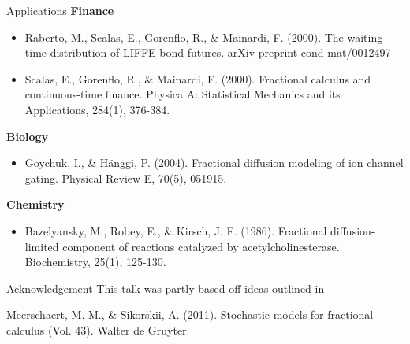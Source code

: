 \documentclass[pdf]{beamer}
\begin{document}
\begin{frame}{Applications}
    \textbf{Finance}
    \begin{itemize}
        \item Raberto, M., Scalas, E., Gorenflo, R., \& Mainardi, F. (2000). The waiting-time distribution of LIFFE bond futures. arXiv preprint cond-mat/0012497
        \item Scalas, E., Gorenflo, R., \& Mainardi, F. (2000). Fractional calculus and continuous-time finance. Physica A: Statistical Mechanics and its Applications, 284(1), 376-384.
    \end{itemize}
    \textbf{Biology}
    \begin{itemize}
        \item Goychuk, I., \& Hänggi, P. (2004). Fractional diffusion modeling of ion channel gating. Physical Review E, 70(5), 051915.
    \end{itemize}
    \textbf{Chemistry}
    \begin{itemize}
        \item Bazelyansky, M., Robey, E., \& Kirsch, J. F. (1986). Fractional diffusion-limited component of reactions catalyzed by acetylcholinesterase. Biochemistry, 25(1), 125-130.
    \end{itemize}
\end{frame}

\begin{frame}{Acknowledgement}
    This talk was partly based off ideas outlined in
    
    Meerschaert, M. M., \& Sikorskii, A. (2011). Stochastic models for fractional calculus (Vol. 43). Walter de Gruyter.
\end{frame}
\end{document}
